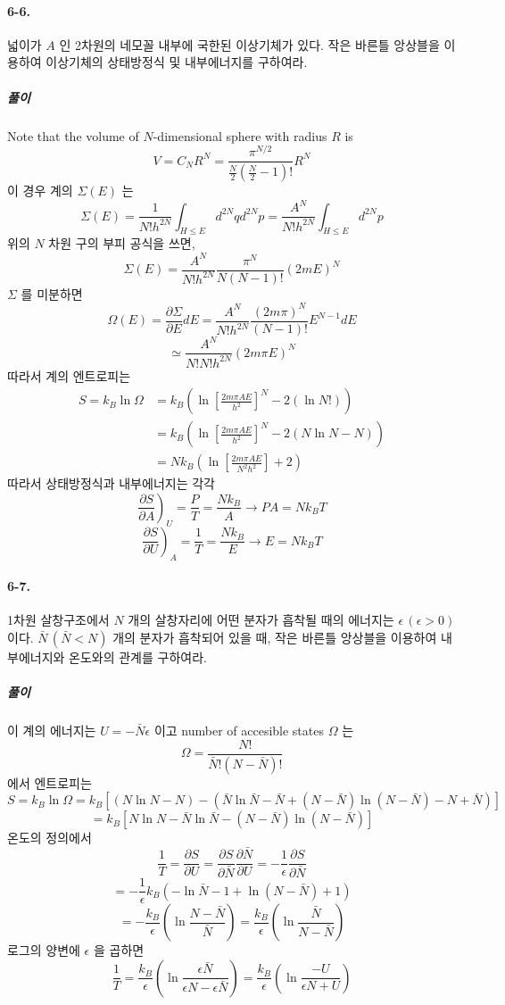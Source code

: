 \documentclass[a4paper,12pt]{report}
\newcommand{\Maxwell}[3][]{\left.\frac{\partial #2}{\partial #3} \right)_{#1} }
\begin{document}
	\paragraph{6-6. } 넓이가 $A$ 인 2차원의 네모꼴 내부에 국한된 이상기체가 있다. 작은 바른틀 앙상블을 이용하여 이상기체의 상태방정식 및 내부에너지를 구하여라. 
	\subparagraph{풀이} Note that the volume of $N$-dimensional sphere with radius $R$ is
	$$V=C_NR^N=\frac{\pi^{N/2}}{\frac{N}{2}\left(\frac{N}{2}-1 \right)! }R^N$$
	이 경우 계의 $\Sigma(E)$ 는
	$$\Sigma(E)=\frac{1}{N!h^{2N}}\int_{H\le E}d^{2N}qd^{2N}p=\frac{A^N}{N!h^{2N}}\int_{H\le E}d^{2N}p$$
	위의 $N$ 차원 구의 부피 공식을 쓰면,
	$$\Sigma(E)=\frac{A^N}{N!h^{2N}}\frac{\pi^N}{N(N-1)!}(2mE)^N$$
	$\Sigma$ 를 미분하면
	$$\Omega(E)=\frac{\partial \Sigma}{\partial E}dE=\frac{A^N}{N!h^{2N}}\frac{(2m\pi)^N}{(N-1)!}E^{N-1}dE$$
	$$\simeq\frac{A^N}{N!N!h^{2N}}(2m\pi E)^N$$
	따라서 계의 엔트로피는 
	\begin{equation*}
		\begin{split}
		S=k_B\ln{\Omega}&=k_B\left(\ln\left[\frac{2m\pi AE}{h^2} \right]^N-2(\ln N!)  \right)\\
		&=k_B\left(\ln\left[\frac{2m\pi AE}{h^2} \right]^N-2(N\ln N-N) \right)  \\
		&=Nk_B\left(\ln \left[\frac{2m\pi AE}{N^2h^2} \right]+2  \right) 
		\end{split}
	\end{equation*}
	따라서 상태방정식과 내부에너지는 각각
	$$\Maxwell[U]{S}{A}=\frac{P}{T}=\frac{Nk_B}{A}\rightarrow PA=Nk_BT $$
	$$\Maxwell[A]{S}{U}=\frac{1}{T}=\frac{Nk_B}{E}\rightarrow E=Nk_BT$$
	\paragraph{6-7. } 1차원 살창구조에서 $N$ 개의 살창자리에 어떤 분자가 흡착될 때의 에너지는 $\epsilon\,(\epsilon>0)$ 이다. $\bar{N}\,(\bar{N}<N)$ 개의 분자가 흡착되어 있을 때, 작은 바른틀 앙상블을 이용하여 내부에너지와 온도와의 관계를 구하여라.
	\subparagraph{풀이} 이 계의 에너지는 $U=-\bar{N} \epsilon$ 이고 number of accesible states $\Omega$ 는
	$$\Omega=\frac{N!}{\bar{N}!(N-\bar{N})!}$$
	에서 엔트로피는 
	$$S=k_B\ln\Omega=k_B[(N\ln N-N)-(\bar{N}\ln\bar{N}-\bar{N}+(N-\bar{N})\ln(N-\bar{N})-N+\bar{N})]$$
	$$=k_B[N\ln N-\bar{N}\ln\bar{N}-(N-\bar{N})\ln(N-\bar{N})]$$
	온도의 정의에서
	$$\frac{1}{T}=\frac{\partial S}{\partial U}=\frac{\partial S}{\partial \bar{N}}\frac{\partial \bar{N}}{\partial U}=-\frac{1}{\epsilon}\frac{\partial S}{\partial \bar{N}}$$
	$$=-\frac{1}{\epsilon}k_B(-\ln \bar{N}-1+\ln(N-\bar{N})+1)$$
	$$=-\frac{k_B}{\epsilon}\left(\ln\frac{N-\bar{N}}{\bar{N}} \right)=\frac{k_B}{\epsilon}\left(\ln\frac{\bar{N}}{N-\bar{N}} \right)  $$
	로그의 양변에 $\epsilon$ 을 곱하면
	$$\frac{1}{T}=\frac{k_B}{\epsilon}\left(\ln\frac{\epsilon\bar{N}}{\epsilon N-\epsilon\bar{N}} \right)=\frac{k_B}{\epsilon}\left(\ln\frac{-U}{\epsilon N+U} \right) $$
\end{document}
